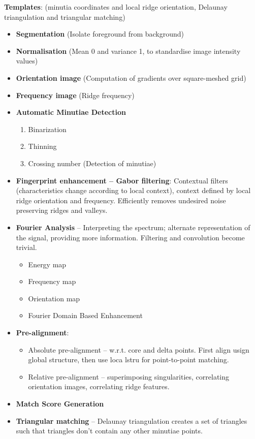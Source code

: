 \documentclass[a4paper]{article}
\begin{document}
      \textbf{Templates}: (minutia coordinates and local ridge orientation, Delaunay triangulation and triangular matching)
      \begin{itemize}
        \item \textbf{Segmentation} (Isolate foreground from background)
        \item \textbf{Normalisation} (Mean 0 and variance 1, to standardise image intensity values)
        \item \textbf{Orientation image} (Computation of gradients over square-meshed grid)
        \item \textbf{Frequency image} (Ridge frequency)
        \item \textbf{Automatic Minutiae Detection}
        \begin{enumerate}
          \item Binarization
          \item Thinning
          \item Crossing number (Detection of minutiae)
        \end{enumerate}
        \item \textbf{Fingerprint enhancement -- Gabor filtering}: Contextual filters (characteristics change according to local context), context defined by local ridge orientation and frequency. Efficiently removes undesired noise preserving ridges and valleys.
        \item \textbf{Fourier Analysis} -- Interpreting the spectrum; alternate representation of the signal, providing more information. Filtering and convolution become trivial.
        \begin{itemize}
          \item Energy map
          \item Frequency map
          \item Orientation map
          \item Fourier Domain Based Enhancement
        \end{itemize}
        \item \textbf{Pre-alignment}:
        \begin{itemize}
          \item Absolute pre-alignment -- w.r.t. core and delta points. First align usign global structure, then use loca lstru  for point-to-point matching.
          \item Relative pre-alignment -- superimposing singularities, correlating orientation images, correlating ridge features.
        \end{itemize}
        \item \textbf{Match Score Generation}
        \item \textbf{Triangular matching} -- Delaunay triangulation creates a set of triangles such that triangles don't contain any other minutiae points.
      \end{itemize}
\end{document}
